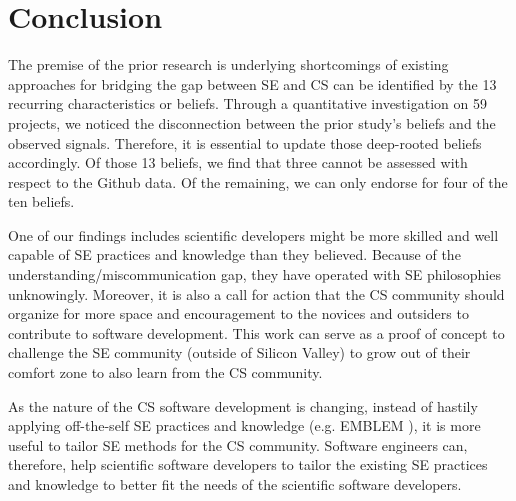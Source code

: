 \documentclass[sigconf,review,anonymous]{acmart}
\begin{document}






\section{Conclusion}

The premise of the prior research \cite{johan18_secs} is underlying shortcomings of existing approaches for bridging the gap between SE and CS can be identified by the 13 recurring characteristics or beliefs. Through a quantitative investigation on 59 projects, we noticed the disconnection between the prior study's beliefs and the observed signals. Therefore, it is essential to update those deep-rooted beliefs accordingly. Of those 13 beliefs,
we find that three cannot be assessed
with respect to the Github data.
Of the remaining,
we can only endorse for four of the ten beliefs. 

One of our findings includes scientific developers might be more skilled and well capable of SE practices and knowledge than they believed. Because of the understanding/miscommunication gap, they have operated with SE philosophies unknowingly. Moreover, it is also a call for action that the CS community should organize for more space and encouragement to the novices and outsiders to contribute to software development. This work can serve as a proof of concept to challenge the SE community (outside of Silicon Valley) to grow out of their comfort zone to also learn from the CS community. 

As the nature of the CS software development is changing, instead of hastily applying off-the-self SE practices and knowledge (e.g. EMBLEM \cite{tu2019better}), it is more useful to tailor SE methods for the CS community. Software engineers can, therefore, help scientific software developers to tailor the existing SE practices and knowledge to better fit the needs of the scientific software developers.
\end{document}
